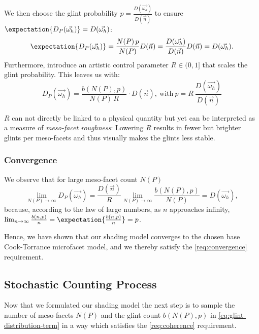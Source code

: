 We then choose the glint probability $p = \frac{D(\vec{\omega_h})}{D(\vec{n})}$ to ensure $\expectation{D_P(\vec{\omega_h})} = D(\vec{\omega_h})$:
%
\begin{equation}
    \expectation{D_P(\vec{\omega_h})}
    = \frac{N(P) \, p}{N(P)} D(\vec{n})
    = \frac{D(\vec{\omega_h})}{D(\vec{n})} D(\vec{n})
    = D(\vec{\omega_h}).
\end{equation}
%
Furthermore, \textcite{deliot2023} introduce an artistic control parameter $R \in (0,1]$ that scales the glint probability. This leaves us with:
%
\begin{equation}
\label{eq:glint-distribution-term}
    D_P(\vec{\omega_h})=\frac{b(N(P), p)}{N(P)\,R} \cdot D(\vec{n}),
    ~\text{with}~
    p = R~\frac{D(\vec{\omega_h})}{D(\vec{n})}
\end{equation}


$R$ can not directly be linked to a physical quantity but yet can be interpreted as a measure of \emph{meso-facet roughness}: Lowering $R$ results in fewer but brighter glints per meso-facets and thus visually makes the glints less stable.


\subsubsection{Convergence}
\label{sec:convergence-proof}

We observe that for large meso-facet count $N(P)$
%
\begin{equation}
    \lim_{N(P) \to \infty} D_P(\vec{\omega_h})
    = \frac{D(\vec{n})}{R} \lim_{N(P) \to \infty} \frac{b(N(P), p)}{N(P)}
    = D(\vec{\omega_h}),
\end{equation}
%
because, according to the law of large numbers, as $n$ approaches infinity, $\lim_{n \to \infty}\frac{b(n,p)}{n}=\expectation{\frac{b(n,p)}{n}}=p$.


Hence, we have shown that our shading model converges to the chosen base Cook-Torrance microfacet model, and we thereby satisfy the \ref{req:convergence} requirement.




\subsection{Stochastic Counting Process}
\label{sec:stochastic-counting-process}

Now that we formulated our shading model the next step is to sample the number of meso-facets $N(P)$ and the glint count $b(N(P),p)$ in \cref{eq:glint-distribution-term} in a way which satisfies the \ref{req:coherence} requirement.


